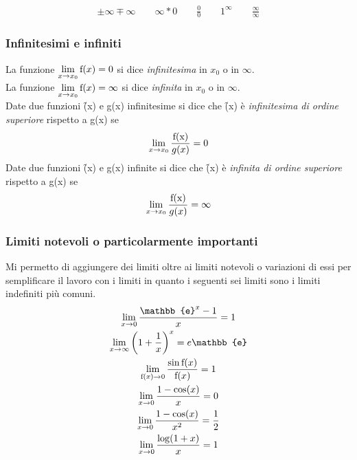 		\begin{gather*}
		  \pm\infty\mp\infty\qquad \infty *0\qquad
		  \frac{0}{0}\qquad
		  1^{\infty} \qquad
		  \frac{\infty}{\infty}
		 \end{gather*}
		  
		  \subsubsection{Infinitesimi e infiniti}
		   La funzione $\mathop{\lim}\limits_{x \to x_0} \text{\text{f}}(x)=0$ si dice \textit{infinitesima} in $x_0$ o in $\infty$.\\
		   La funzione $\mathop{\lim}\limits_{x \to x_0} \text{\text{f}}(x)=\infty$ si dice \textit{infinita} in $x_0$ o in $\infty$.\\
		   
		   Date due funzioni \f(x) e g(x) infinitesime si dice che \f(x) è \textit{infinitesima di ordine superiore} rispetto a g(x) se
		   \[
		   \mathop{\lim}\limits_{x \to x_0}\frac{\text{\text{f}(x)}}{g(x)}=0
		   \]
		   Date due funzioni \f(x) e g(x) infinite si dice che \f(x) è \textit{infinita di ordine superiore} rispetto a g(x) se
		   \[
		   \mathop{\lim}\limits_{x \to x_0}\frac{\text{\text{f}(x)}}{g(x)}=\infty
		   \]
		   
		   \subsubsection{Limiti notevoli o particolarmente importanti}
Mi permetto di aggiungere dei limiti oltre ai limiti notevoli o variazioni di essi per semplificare il lavoro con i limiti in quanto i seguenti sei limiti sono i limiti indefiniti più comuni.
		   \begin{gather}
		   \mathop{\lim}\limits_{x \to 0} \frac{\mathbb{e}^x-1}{x}=1\\
			\mathop{\lim}\limits_{x \to \infty} \left({1+\frac{1}{x}}\right)^x=e\mathbb{e}\\
		   \mathop{\lim}\limits_{\text{\f}(x) \to 0}\frac{\sin\text{\f}(x)}{\text{\f}(x)}=1\\
			\mathop{\lim}\limits_{x \to 0}\frac{1-\cos(x)}{x}=0\\
			\mathop{\lim}\limits_{x \to 0}\frac{1-\cos(x)}{x^2}=\frac{1}{2}\\
			\mathop{\lim}\limits_{x \to 0}\frac{\log(1+x)}{x}=1
			\end{gather}
